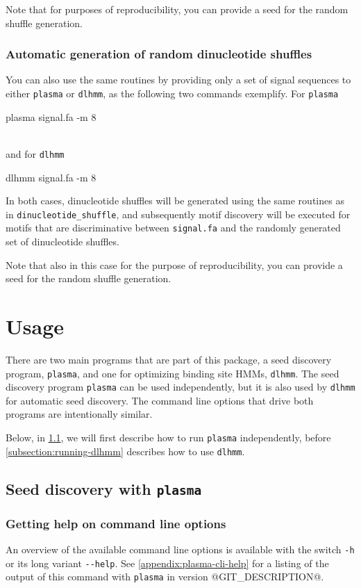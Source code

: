 \documentclass[a4paper]{article}
\makeatletter
\newcommand{\plasma}[0]{\texttt{plasma}}
\newcommand{\dlhmm}[0]{\texttt{dlhmm}}
\newcommand{\dinuclshuffle}[0]{\texttt{dinucleotide\_shuffle}}
\newcommand{\version}[0]{@GIT_DESCRIPTION@}
\makeatother
\begin{document}
Note that for purposes of reproducibility, you can provide a seed for the random shuffle generation.

\subsubsection{Automatic generation of random dinucleotide shuffles}
You can also use the same routines by providing only a set of signal sequences to either \plasma{} or \dlhmm{}, as the following two commands exemplify.
For \plasma{}\\
\begin{verbbox}
plasma signal.fa -m 8
\end{verbbox}
\fbox{\theverbbox[t]}\\
and for \dlhmm{}\\
\begin{verbbox}
dlhmm signal.fa -m 8
\end{verbbox}
\fbox{\theverbbox[t]}

In both cases, dinucleotide shuffles will be generated using the same routines as in \dinuclshuffle{}, and subsequently motif discovery will be executed for motifs that are discriminative between \verb|signal.fa| and the randomly generated set of dinucleotide shuffles.

Note that also in this case for the purpose of reproducibility, you can provide a seed for the random shuffle generation.



\section{Usage}
There are two main programs that are part of this package, a seed discovery program, \plasma{}, and one for optimizing binding site HMMs, \dlhmm{}.
The seed discovery program \plasma{} can be used independently, but it is also used by \dlhmm{} for automatic seed discovery.
The command line options that drive both programs are intentionally similar.

Below, in \cref{subsection:running-plasma}, we will first describe how to run \plasma{} independently, before \cref{subsection:running-dlhmm} describes how to use \dlhmm{}.

\subsection{Seed discovery with \plasma{}}
\label{subsection:running-plasma}
\subsubsection{Getting help on command line options}
An overview of the available command line options is available with the switch \verb|-h| or its long variant \verb|--help|.
See \cref{appendix:plasma-cli-help} for a listing of the output of this command with \plasma{} in version \version{}.
\end{document}
